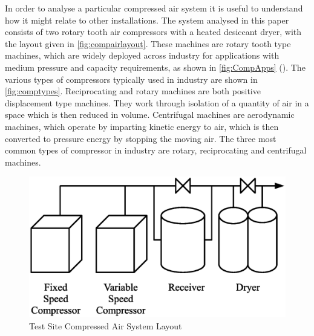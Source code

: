 
In order to analyse a particular compressed air system it is useful to understand how it might relate to other installations. The system analysed in this paper consists of two rotary tooth air compressors with a heated desiccant dryer, with the layout given in \autoref{fig:compairlayout}. These machines are rotary tooth type machines, which are widely deployed across industry for applications with medium pressure and capacity requirements, as shown in \autoref{fig:CompApps} (\cite{SEAI2007}). The various types of compressors typically used in industry are shown in \autoref{fig:comptypes}. Reciprocating and rotary machines are both positive displacement type machines. They work through isolation of a quantity of air in a space which is then reduced in volume. Centrifugal machines are aerodynamic machines, which operate by imparting kinetic energy to air, which is then converted to pressure energy by stopping the moving air. The three most common types of compressor in industry are rotary, reciprocating and centrifugal machines.

\begin{figure}
\includegraphics[width = \columnwidth]{./Images/PharmacyCompAir.eps}
\caption{Test Site Compressed Air System Layout}
\label{fig:compairlayout}
\end{figure}

